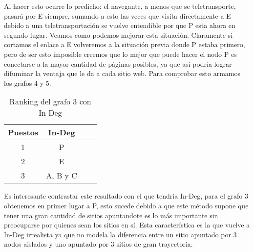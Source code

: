 Al hacer esto ocurre lo predicho: el navegante, a menos que se teletransporte, pasará por E siempre, sumando a esto las veces que visita directamente a E debido a una teletransportación se vuelve entendible por que P esta ahora en segundo lugar. Veamos como podemos mejorar esta situación. Claramente si cortamos el enlace a E volveremos a la situación previa donde P estaba primero, pero de ser esto imposible creemos que lo mejor que puede hacer el nodo P es conectarse a la mayor cantidad de páginas posibles, ya que así podría lograr difuminar la ventaja que le da a cada sitio web. Para comprobar esto armamos los grafos 4 y 5.

\begin{table}[H]
\centering
\begin{tabular}{| c | c | c | c |}
  \hline
  \rowcolor{LightCyan}
  Puestos & In-Deg\\ \hline \hline
  1 & P\\ \hline
  2 & E\\ \hline
  3 & A, B y C\\ \hline
\end{tabular}
  \caption{\footnotesize{Ranking del grafo 3 con In-Deg}}
  \label{tab:Rankings4}
\end{table}


Es interesante contrastar este resultado con el que tendría In-Deg, para el grafo 3 obtenemos en primer lugar a P, esto sucede debido a que este método supone que tener una gran cantidad de sitios apuntandote es lo más importante sin preocuparse por quienes sean los sitios en sí. Esta característica es la que vuelve a In-Deg irrealista ya que no modela la diferencia entre un sitio apuntado por 3 nodos aislados y uno apuntado por 3 sitios de gran trayectoria.

